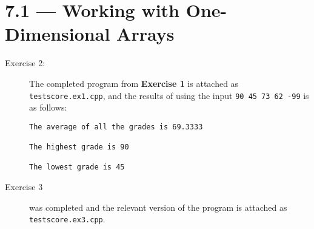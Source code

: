 \documentclass[11pt]{article}
\begin{document}
\section*{7.1 --- Working with One-Dimensional Arrays}
\begin{description}
    \item[Exercise 2:] The completed program from \textbf{Exercise 1} is attached as \texttt{testscore.ex1.cpp}, and the results of using the input \texttt{90 45 73 62 -99} is as follows: \begin{verbatim}
The average of all the grades is 69.3333

The highest grade is 90

The lowest grade is 45
    \end{verbatim}
    \item[Exercise 3] was completed and the relevant version of the program is attached as \texttt{testscore.ex3.cpp}. 
\end{description}
\end{document}
